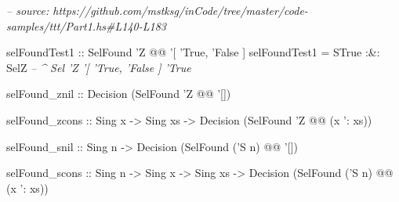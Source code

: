 \documentclass[]{article}
\newenvironment{Shaded}{}{}
\newcommand{\CommentTok}[1]{\textcolor[rgb]{0.38,0.63,0.69}{\textit{#1}}}
\newcommand{\DataTypeTok}[1]{\textcolor[rgb]{0.56,0.13,0.00}{#1}}
\newcommand{\FunctionTok}[1]{\textcolor[rgb]{0.02,0.16,0.49}{#1}}
\newcommand{\NormalTok}[1]{#1}
\newcommand{\OtherTok}[1]{\textcolor[rgb]{0.00,0.44,0.13}{#1}}
\begin{document}
\begin{Shaded}
\begin{Highlighting}[]
\CommentTok{-- source: https://github.com/mstksg/inCode/tree/master/code-samples/ttt/Part1.hs#L140-L183}

\OtherTok{selFoundTest1 ::} \DataTypeTok{SelFound}\NormalTok{ '}\DataTypeTok{Z} \FunctionTok{@@}\NormalTok{ '[ '}\DataTypeTok{True}\NormalTok{, '}\DataTypeTok{False}\NormalTok{ ]}
\NormalTok{selFoundTest1 }\FunctionTok{=} \DataTypeTok{STrue} \FunctionTok{:&:} \DataTypeTok{SelZ}
                       \CommentTok{-- ^ Sel 'Z '[ 'True, 'False ] 'True}

\NormalTok{selFound_znil}
\OtherTok{    ::} \DataTypeTok{Decision}\NormalTok{ (}\DataTypeTok{SelFound}\NormalTok{ '}\DataTypeTok{Z} \FunctionTok{@@}\NormalTok{ '[])}

\NormalTok{selFound_zcons}
\OtherTok{    ::} \DataTypeTok{Sing}\NormalTok{ x}
    \OtherTok{->} \DataTypeTok{Sing}\NormalTok{ xs}
    \OtherTok{->} \DataTypeTok{Decision}\NormalTok{ (}\DataTypeTok{SelFound}\NormalTok{ '}\DataTypeTok{Z} \FunctionTok{@@}\NormalTok{ (x '}\FunctionTok{:}\NormalTok{ xs))}

\NormalTok{selFound_snil}
\OtherTok{    ::} \DataTypeTok{Sing}\NormalTok{ n}
    \OtherTok{->} \DataTypeTok{Decision}\NormalTok{ (}\DataTypeTok{SelFound}\NormalTok{ ('}\DataTypeTok{S}\NormalTok{ n) }\FunctionTok{@@}\NormalTok{ '[])}

\NormalTok{selFound_scons}
\OtherTok{    ::} \DataTypeTok{Sing}\NormalTok{ n}
    \OtherTok{->} \DataTypeTok{Sing}\NormalTok{ x}
    \OtherTok{->} \DataTypeTok{Sing}\NormalTok{ xs}
    \OtherTok{->} \DataTypeTok{Decision}\NormalTok{ (}\DataTypeTok{SelFound}\NormalTok{ ('}\DataTypeTok{S}\NormalTok{ n) }\FunctionTok{@@}\NormalTok{ (x '}\FunctionTok{:}\NormalTok{ xs))}
\end{Highlighting}
\end{Shaded}
\end{document}
